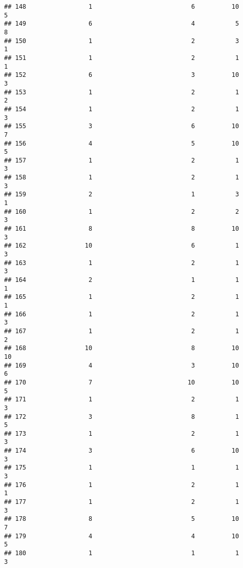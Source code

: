 \documentclass[
]{article}
\begin{document}
\begin{verbatim}
## 148                 1                           6          10               5
## 149                 6                           4           5               8
## 150                 1                           2           3               1
## 151                 1                           2           1               1
## 152                 6                           3          10               3
## 153                 1                           2           1               2
## 154                 1                           2           1               3
## 155                 3                           6          10               7
## 156                 4                           5          10               5
## 157                 1                           2           1               3
## 158                 1                           2           1               3
## 159                 2                           1           3               1
## 160                 1                           2           2               3
## 161                 8                           8          10               3
## 162                10                           6           1               3
## 163                 1                           2           1               3
## 164                 2                           1           1               1
## 165                 1                           2           1               1
## 166                 1                           2           1               3
## 167                 1                           2           1               2
## 168                10                           8          10              10
## 169                 4                           3          10               6
## 170                 7                          10          10               5
## 171                 1                           2           1               3
## 172                 3                           8           1               5
## 173                 1                           2           1               3
## 174                 3                           6          10               3
## 175                 1                           1           1               3
## 176                 1                           2           1               1
## 177                 1                           2           1               3
## 178                 8                           5          10               7
## 179                 4                           4          10               5
## 180                 1                           1           1               3

\end{verbatim}
\end{document}
